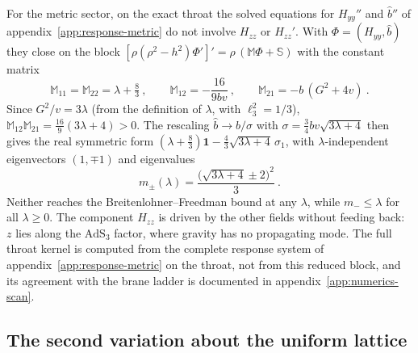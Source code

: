 For the metric sector, on the exact throat the solved equations for
$H_{yy}''$ and $\hat b''$ of appendix~\ref{app:response-metric} do not
involve $H_{zz}$ or $H_{zz}'$. With $\Phi = (H_{yy}, \hat b)$ they close on
the block $[\rho(\rho^2 - h^2)\Phi']' = \rho\,(\mathbb{M}\Phi + \mathbb{S})$
with the constant matrix
\begin{equation}
\mathbb{M}_{11} = \mathbb{M}_{22} = \lambda + \tfrac83~, \qquad
\mathbb{M}_{12} = -\frac{16}{9bv}~, \qquad \mathbb{M}_{21} = -b\,(G^2 + 4v)~.
\end{equation}
Since $G^2/v = 3\lambda$ (from the definition of $\lambda$, with
$\ell_3^2 = 1/3$), $\mathbb{M}_{12}\mathbb{M}_{21} = \tfrac{16}{9}(3\lambda + 4) > 0$.
The rescaling $\hat b \to \hat b/\sigma$ with $\sigma = \tfrac34
bv\sqrt{3\lambda + 4}$ then gives the real symmetric form $(\lambda + \tfrac83)
\mathbf{1} - \tfrac43\sqrt{3\lambda + 4}\,\sigma_1$, with
$\lambda$-independent eigenvectors $(1, \mp1)$ and eigenvalues
\begin{equation}
m_\pm(\lambda) = \frac{\big(\sqrt{3\lambda + 4} \pm 2\big)^2}{3}~.
\end{equation}
Neither reaches the Breitenlohner--Freedman bound at any $\lambda$, while
$m_- \le \lambda$ for all $\lambda \ge 0$. The component
$H_{zz}$ is driven by the other fields without feeding back: $z$ lies along
the $\mathrm{AdS}_3$ factor, where gravity has no propagating mode.
The full throat kernel is computed from the complete response system of
appendix~\ref{app:response-metric} on the throat, not from this reduced block, and its
agreement with the brane ladder is documented in appendix~\ref{app:numerics-scan}.

\subsection{The second variation about the uniform lattice}
\label{app:response-hessian}


